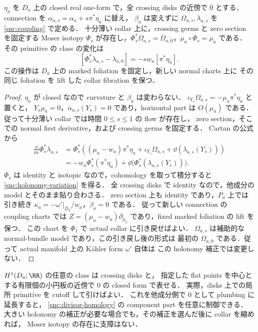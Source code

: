 \begin{lemma}
\label{snc:holonomy}
$\eta_a$ を $D_a$ 上の closed real one-form で，全 crossing disks の近傍で $0$ とする．
connection を $\alpha_{a,s}=\alpha_a+s\pi^*\eta_a$ に替え，
$\beta_a$ は変えずに $\Omega_{a,s},\lambda_{a,s}$ を \eqref{snc:coupling} で定める．
十分薄い collar 上に，crossing germs と zero section を固定する Moser isotopy
$\Phi_s$ が存在し，$\Phi_s^*\Omega_{a,s}=\Omega_{a,0}$，$\mu_a\circ\Phi_s=\mu_a$ である．
その primitive の class の変化は
\begin{equation}\label{snc:holonomy-variation}
 [\Phi_s^*\lambda_{a,s}-\lambda_{a,0}]
     =-s w_a[\pi^*\eta_a].
\end{equation}
この操作は $D_a$ 上の marked foliation を固定し，新しい normal charts 上に
その同じ foliation を lift した collar fibration を保つ．
\end{lemma}
\begin{proof}
$\eta_a$ が closed なので curvature と $\beta_a$ は変わらない．
$\iota_{Y_s}\Omega_{a,s}=-\mu_a\pi^*\eta_a$ と置くと，
$Y_s\mu_a=0$，$\alpha_{a,s}(Y_s)=0$ であり，horizontal part は $O(\mu_a)$ である．
従って十分薄い collar では時間 $0\leq s\leq1$ の flow が存在し，
zero section，そこでの normal first derivative，および crossing germs を固定する．
Cartan の公式から
\begin{align*}
 \frac{\dd}{\dd s}\Phi_s^*\lambda_{a,s}
 &=\Phi_s^*\left((\mu_a-w_a)\pi^*\eta_a
                +\iota_{Y_s}\Omega_{a,s}
                +\dd(\lambda_{a,s}(Y_s))\right)\\
 &=-w_a\Phi_s^*(\pi^*\eta_a)
      +\dd\bigl(\Phi_s^*(\lambda_{a,s}(Y_s))\bigr).
\end{align*}
$\Phi_s$ は identity と isotopic なので，cohomology を取って積分すると
\eqref{snc:holonomy-variation} を得る．
全 crossing disks で identity なので，他成分の model とそのまま貼り合わさる．
zero section 上も identity であり，$P_a$ 上では引き続き
$\kappa_a=-\omega'|_{D_a}/w_a$，$\beta_a=0$ である．
従って新しい connection の coupling charts では
$Z=(\mu_a-w_a)\partial_{\mu_a}$ であり，fixed marked foliation の lift を保つ．
この chart を $\Phi_1$ で actual collar に引き戻せばよい．
$\Omega_{a,s}$ は補助的な normal-bundle model であり，この引き戻し後の形式は
最初の $\Omega_{a,0}$ である．従って actual manifold 上の Kähler form $\omega'$ 自体は
この holonomy 補正では変更しない．
\end{proof}

$H^1(D_a;\RR)$ の任意の class は crossing disks と，
指定した flat points を中心とする有限個の小円板の近傍で $0$ の closed form で表せる．
実際，disks 上での局所 primitive を cutoff して引けばよい．
これを他成分側で $0$ として plumbing に延長すると，
\eqref{snc:divisor-homology} の component part を任意に制御できる．
大きい holonomy の補正が必要な場合でも，その補正を選んだ後に collar を縮めれば，
Moser isotopy の存在に支障はない．

